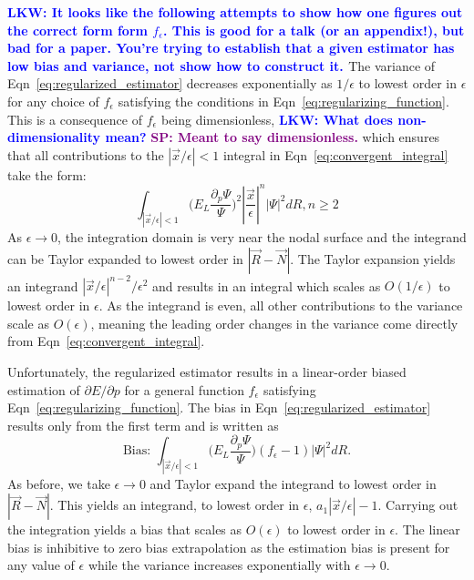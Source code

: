 \documentclass[twocolumn]{revtex4-1}
\newcommand{\lucas}[1]{\textbf{\textcolor{blue}{LKW: #1}}}
\newcommand{\shivesh}[1]{\textbf{\textcolor{purple}{SP: #1}}}
\begin{document}
\lucas{It looks like the following attempts to show how one figures out the correct form form $f_\epsilon$. This is good for a talk (or an appendix!), but bad for a paper. You're trying to establish that a given estimator has low bias and variance, not show how to construct it. }
The variance of Eqn~\ref{eq:regularized_estimator} decreases exponentially as $1/\epsilon$ to lowest order in $\epsilon$ for any choice of $f_\epsilon$ satisfying the conditions in Eqn~\ref{eq:regularizing_function}.
This is a consequence of $f_\epsilon$ being dimensionless, \lucas{What does non-dimensionality mean?} \shivesh{Meant to say dimensionless.} which ensures that all contributions to the $|\vec{x}/\epsilon|< 1$ integral in Eqn~\ref{eq:convergent_integral} take the form:
\begin{equation}
\int_{|\vec{x}/\epsilon|< 1} \Big(E_L\frac{\partial_p\Psi}{\Psi}\Big)^2 |\frac{\vec{x}}{\epsilon}|^n |\Psi|^2 dR, n\geq 2
\end{equation}
As $\epsilon \rightarrow 0$, the integration domain is very near the nodal surface and the integrand can be Taylor expanded to lowest order in $|\vec{R}-\vec{N}|$. 
The Taylor expansion yields an integrand $|\vec{x}/\epsilon|^{n-2}/\epsilon^2$ and results in an integral which scales as $O(1/\epsilon)$ to lowest order in $\epsilon$.
As the integrand is even, all other contributions to the variance scale as $O(\epsilon)$, meaning the leading order changes in the variance come directly from Eqn~\ref{eq:convergent_integral}.

Unfortunately, the regularized estimator results in a linear-order biased estimation of $\partial E/\partial p$ for a general function $f_\epsilon$ satisfying Eqn~\ref{eq:regularizing_function}.
The bias in Eqn~\ref{eq:regularized_estimator} results only from the first term and is written as 
\begin{equation}
\text{Bias: } \int_{|\vec{x}/\epsilon|< 1} \Big(E_L\frac{\partial_p\Psi}{\Psi}\Big) (f_\epsilon - 1)|\Psi|^2 dR.
\label{eq:estimator_bias}
\end{equation}
As before, we take $\epsilon \rightarrow 0$ and Taylor expand the integrand to lowest order in $|\vec{R}-\vec{N}|$.
This yields an integrand, to lowest order in $\epsilon$, $a_1|\vec{x}/\epsilon| - 1$.
Carrying out the integration yields a bias that scales as $O(\epsilon)$ to lowest order in $\epsilon$.
The linear bias is inhibitive to zero bias extrapolation as the estimation bias is present for any value of $\epsilon$ while the variance increases exponentially with $\epsilon \rightarrow 0$.
\end{document}
